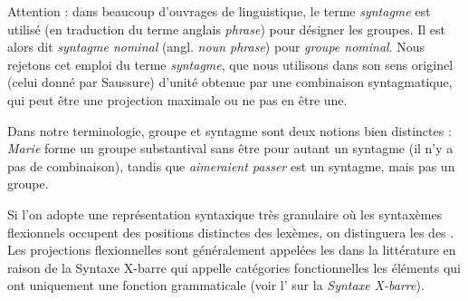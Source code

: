 \begin{tblsframed}{}
\noindent Attention : dans beaucoup d’ouvrages de linguistique, le terme \textit{syntagme} est utilisé (en traduction du terme anglais \textit{phrase}) pour désigner les groupes. Il est alors dit \textit{syntagme nominal} (angl. \textit{noun phrase}) pour \textit{groupe nominal}. Nous rejetons cet emploi du terme \textit{syntagme}, que nous utilisons dans son sens originel (celui donné par Saussure) d’unité obtenue par une combinaison syntagmatique, qui peut être une projection maximale ou ne pas en être une.

Dans notre terminologie, groupe et syntagme sont deux notions bien distinctes : \textit{Marie} forme un groupe substantival sans être pour autant un syntagme (il n’y a pas de combinaison), tandis que \textit{aimeraient passer} est un syntagme, mais pas un groupe.
\end{tblsframed}



Si l’on adopte une représentation syntaxique très granulaire où les syntaxèmes flexionnels occupent des positions distinctes des lexèmes, on distinguera les  des . Les projections flexionnelles sont généralement appelées les  dans la littérature en raison de la Syntaxe X-barre qui appelle catégories fonctionnelles les éléments qui ont uniquement une fonction grammaticale (voir l’ sur la \textit{Syntaxe X-barre}).



